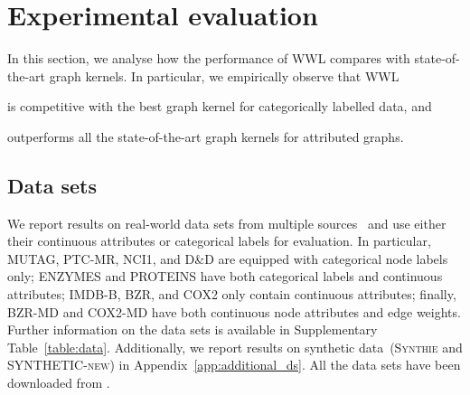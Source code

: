 \documentclass{article}
\begin{document}
\begin{comment}
 \begin{tabular}{lcccccccc}
    \toprule
    Method & BZR & COX2 & BZR-MD & COX2-MD\\
    \midrule
    VH-CONT  & $74.82 \pm 2.13$ & $48.51 \pm 0.63$ & $66.58 \pm 0.97$ & $64.89 \pm 1.06$ \\
    RBF-WL & $80.96 \pm 1.67$ &$75.45 \pm 1.53$ & ($69.44 \pm 1.02$) & $71.83 \pm 1.61$ \\
    \midrule
    HGK-WL & $ 78.59 \pm 0.63 $ & $ 78.13 \pm 0.45 $  & $ 68.94 \pm 0.65 $ & $ 74.61 \pm 1.74 $ \\
    HGK-SP & $ 76.42 \pm 0.72 $ & $ 72.57 \pm 1.18 $  & $ 66.17 \pm 1.05 $ & $ 68.52 \pm 1.00 $ \\
    \midrule
    GH & $76.49 \pm 0.99$ & $76.41 \pm 1.39$ & $69.14 \pm 2.08$ &  $66.20 \pm 1.05$\\
    \midrule
    WWL  &  $\mathbf{84.42 \pm 2.03}$ & $78.29 \pm 0.47$ & $ 69.76 \pm 0.94$ & $\mathbf{76.33 \pm 1.02}$ \\
    
    \bottomrule
\end{tabular}
\end{comment}

\section{Experimental evaluation}
\label{sec:results}

In this section, we analyse how the performance of WWL compares with state-of-the-art graph kernels. In particular, we empirically observe that WWL
\begin{inparaenum}[(1)]
    \item is competitive with the best graph kernel for categorically labelled data, and
    \item outperforms all the state-of-the-art graph kernels for attributed graphs. 
\end{inparaenum}

\subsection{Data sets}

We report results on real-world data sets from multiple sources~\citep{borgwardt2005protein, vishwanathan2010graph,shervashidze2011weisfeiler} and use either their continuous attributes or categorical labels for evaluation. In particular, \textsc{MUTAG}, \textsc{PTC-MR}, \textsc{NCI1}, and \textsc{D\&D} are equipped with categorical node labels only; \textsc{ENZYMES} and  \textsc{PROTEINS} have both categorical labels and continuous attributes; \textsc{IMDB-B}, \textsc{BZR}, and \textsc{COX2} only contain continuous attributes; finally, \textsc{BZR-MD} and \textsc{COX2-MD} have both continuous node attributes and edge weights. 
Further information on the data sets is available in Supplementary Table~\ref{table:data}. 
Additionally, we report results on synthetic data~(\textsc{Synthie} and \textsc{SYNTHETIC-new}) in Appendix~\ref{app:additional_ds}. All the data sets have been downloaded from \citet{repoker2016}. 
\end{document}

